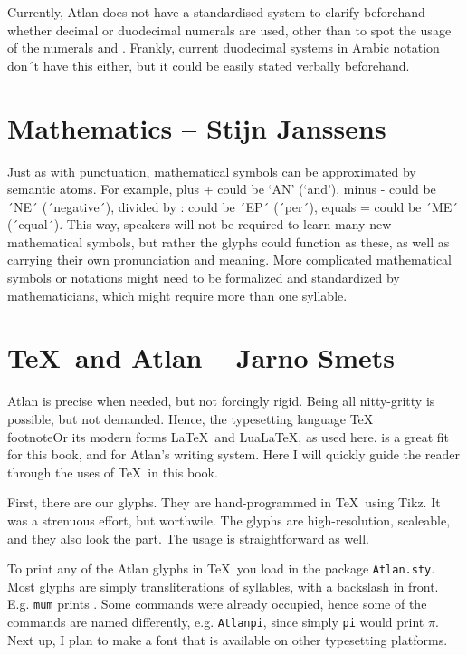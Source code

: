 Currently, Atlan does not have a standardised system to clarify beforehand whether decimal or duodecimal numerals are used, other than to spot the usage of the numerals  and . Frankly, current duodecimal systems in Arabic notation don´t have this either, but it could be easily stated verbally beforehand.  

 

\section{Mathematics -- {\small Stijn Janssens}}

Just as with punctuation, mathematical symbols can be approximated by semantic atoms. For example, plus + could be ‘AN’ \an (‘and’), minus - could be ´NE´ \ne (´negative´), divided by : could be ´EP´ \raisebox{-0.5em}{\ep} (´per´), equals = could be ´ME´ \raisebox{-0.3em}{\me} (´equal´). This way, speakers will not be required to learn many new mathematical symbols, but rather the glyphs could function as these, as well as carrying their own pronunciation and meaning. More complicated mathematical symbols or notations might need to be formalized and standardized by mathematicians, which might require more than one syllable. 



\section{\TeX\ and Atlan -- {\small Jarno Smets}}
Atlan is precise when needed, but not forcingly rigid. Being all nitty-gritty is possible, but not demanded. Hence, the typesetting language \TeX\\footnote{Or its modern forms \LaTeX\ and Lua\LaTeX, as used here.} is a great fit for this book, and for Atlan's writing system. Here I will quickly guide the reader through the uses of \TeX\ in this book.

First, there are our glyphs. They are hand-programmed in \TeX\ using Tikz. It was a strenuous effort, but worthwile. The glyphs are high-resolution, scaleable, and they also look the part. The usage is straightforward as well. 

To print any of the Atlan glyphs in \TeX\, you load in the package {\tt Atlan.sty}. Most glyphs are simply transliterations of syllables, with a backslash in front. E.g. \texttt{mum} prints \mum. Some commands were already occupied, hence some of the commands are named differently, e.g. \texttt{Atlanpi}, since simply \texttt{pi} would print $\pi$. Next up, I plan to make a font that is available on other typesetting platforms. 

